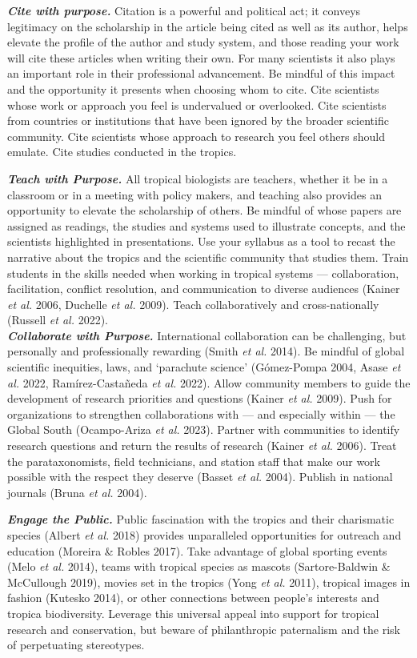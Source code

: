 \documentclass[
  12pt,
  man, donotrepeattitle,floatsintext]{apa6}
\begin{document}
\textbf{\emph{Cite with purpose.}} Citation is a powerful and political act; it conveys legitimacy on the scholarship in the article being cited as well as its author, helps elevate the profile of the author and study system, and those reading your work will cite these articles when writing their own. For many scientists it also plays an important role in their professional advancement. Be mindful of this impact and the opportunity it presents when choosing whom to cite. Cite scientists whose work or approach you feel is undervalued or overlooked. Cite scientists from countries or institutions that have been ignored by the broader scientific community. Cite scientists whose approach to research you feel others should emulate. Cite studies conducted in the tropics.

\textbf{\emph{Teach with Purpose.}} All tropical biologists are teachers, whether it be in a classroom or in a meeting with policy makers, and teaching also provides an opportunity to elevate the scholarship of others. Be mindful of whose papers are assigned as readings, the studies and systems used to illustrate concepts, and the scientists highlighted in presentations. Use your syllabus as a tool to recast the narrative about the tropics and the scientific community that studies them. Train students in the skills needed when working in tropical systems --- collaboration, facilitation, conflict resolution, and communication to diverse audiences (Kainer \emph{et al.} 2006, Duchelle \emph{et al.} 2009). Teach collaboratively and cross-nationally (Russell \emph{et al.} 2022).\\
\textbf{\emph{Collaborate with Purpose.}} International collaboration can be challenging, but personally and professionally rewarding (Smith \emph{et al.} 2014). Be mindful of global scientific inequities, laws, and `parachute science' (Gómez-Pompa 2004, Asase \emph{et al.} 2022, Ramírez-Castañeda \emph{et al.} 2022). Allow community members to guide the development of research priorities and questions (Kainer \emph{et al.} 2009). Push for organizations to strengthen collaborations with --- and especially within --- the Global South (Ocampo-Ariza \emph{et al.} 2023). Partner with communities to identify research questions and return the results of research (Kainer \emph{et al.} 2006). Treat the parataxonomists, field technicians, and station staff that make our work possible with the respect they deserve (Basset \emph{et al.} 2004). Publish in national journals (Bruna \emph{et al.} 2004).

\textbf{\emph{Engage the Public.}} Public fascination with the tropics and their charismatic species (Albert \emph{et al.} 2018) provides unparalleled opportunities for outreach and education (Moreira \& Robles 2017). Take advantage of global sporting events (Melo \emph{et al.} 2014), teams with tropical species as mascots (Sartore-Baldwin \& McCullough 2019), movies set in the tropics (Yong \emph{et al.} 2011), tropical images in fashion (Kutesko 2014), or other connections between people's interests and tropica biodiversity. Leverage this universal appeal into support for tropical research and conservation, but beware of philanthropic paternalism and the risk of perpetuating stereotypes.
\end{document}
